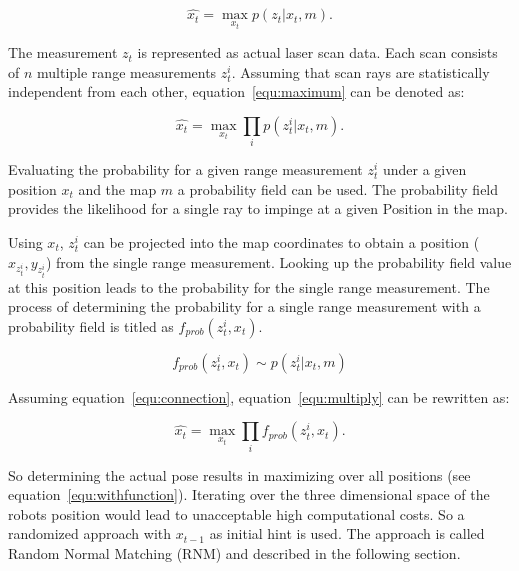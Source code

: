 \documentclass[conference]{IEEEtran}
\begin{document}
\begin{equation}
	\label{equ:maximum}
	\widehat{x_t} = \max_{x_t} p \left (  z_t|x_t,m \right ).
\end{equation}

The measurement $z_t$ is represented as actual laser scan data. Each scan consists of $n$ multiple range measurements $z^i_t$. Assuming that scan rays are statistically independent from each other, equation~\ref{equ:maximum} can be denoted as:

\begin{equation}
	\label{equ:multiply}
	\widehat{x_t} = \max_{x_t} \prod_i p \left ( z^i_t|x_t,m \right ).
\end{equation}

Evaluating the probability for a given range measurement $z^i_t$ under a given position $x_t$ and the map $m$ a probability field can be used. The probability field provides the likelihood for a single ray to impinge at a given Position in the map.

Using $x_t$, $z^i_t$ can be projected into the map coordinates to obtain a position ($x_{z^i_t}, y_{z^i_t}$) from the single range measurement. Looking up the probability field value at this position leads to the probability for the single range measurement. The process of determining the probability for a single range measurement with a probability field is titled as $f_{prob}(z^i_t, x_t)$.

\begin{equation}
\label{equ:connection}
f_{prob}(z^i_t, x_t) \sim p \left ( z^i_t|x_t,m \right )
\end{equation}

\noindent Assuming equation~\ref{equ:connection}, equation~\ref{equ:multiply} can be rewritten as:

\begin{equation}
\label{equ:withfunction}
	\widehat{x_t} = \max_{x_t} \prod_i f_{prob}(z^i_t, x_t).
\end{equation}

So determining the actual pose results in maximizing over all positions (see equation~\ref{equ:withfunction}). Iterating over the three dimensional space of the robots position would lead to unacceptable high computational costs. So a randomized approach with $x_{t-1}$ as initial hint is used. The approach is called Random Normal Matching (RNM) and described in the following section.       
\end{document}
